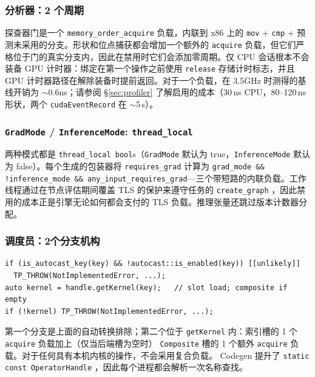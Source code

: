\subsubsection{分析器：2 个周期}

探查器门是一个 \texttt{memory\_order\_acquire} 负载，内联到 x86 上的 \texttt{mov} + \texttt{cmp} + 预测未采用的分支。形状和位点捕获都会增加一个额外的 \texttt{acquire} 负载，但它们严格位于门的真实分支内，因此在禁用时它们会添加零周期。仅 CPU 会话根本不会装备 GPU 计时器：绑定在第一个操作之前使用 \texttt{release} 存储计时标志，并且 GPU 计时器路径在解除装备时提前返回。对于一个负载，在 3.5GHz 时测得的基线开销为 $\sim$0.6ns；请参阅 \S\ref{sec:profiler} 了解启用的成本（30\,ns CPU，80--120\,ns 形状，两个 \texttt{cudaEventRecord} 在 $\sim$5\,\textmu s）。

\subsubsection{\texttt{GradMode} / \texttt{InferenceMode}: \texttt{thread\_local}}

两种模式都是 \texttt{thread\_local bool}s（\texttt{GradMode} 默认为 true，\texttt{InferenceMode} 默认为 false）。每个生成的包装器将 \texttt{requires\_grad} 计算为 \texttt{grad\_mode \&\& !inference\_mode \&\& any\_input\_requires\_grad}---三个带短路的内联负载。工作线程通过在节点评估期间覆盖 TLS 的保护来遵守任务的 \texttt{create\_graph} ，因此禁用的成本正是引擎无论如何都会支付的 TLS 负载。推理张量还跳过版本计数器分配。

\subsubsection{调度员：2个分支机构}

\begin{lstlisting}[caption={Autocast exclusion is one predicted branch; composite fallthrough is the second.}, label=lst:dispbranch]
if (is_autocast_key(key) && !autocast::is_enabled(key)) [[unlikely]]
  TP_THROW(NotImplementedError, ...);
auto kernel = handle.getKernel(key);   // slot load; composite if empty
if (!kernel) TP_THROW(NotImplementedError, ...);
\end{lstlisting}

第一个分支是上面的自动转换排除；第二个位于 \texttt{getKernel} 内：索引槽的 1 个 \texttt{acquire} 负载加上（仅当后端槽为空时） \texttt{Composite} 槽的 1 个额外 \texttt{acquire} 负载。对于任何具有本机内核的操作，不会采用复合负载。 Codegen 提升了 \texttt{static const OperatorHandle} ，因此每个进程都会解析一次名称查找。

